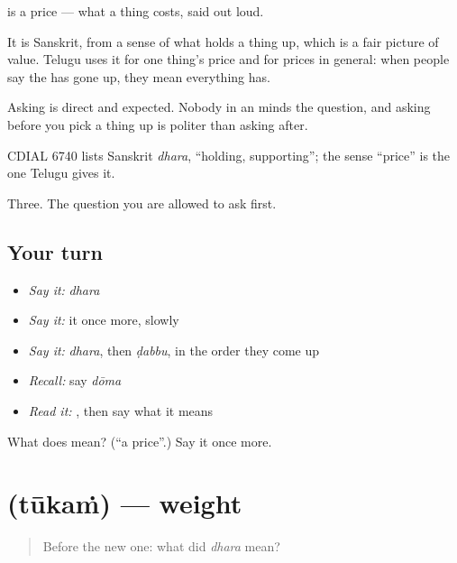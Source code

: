 is a price — what a thing costs, said out loud.

It is Sanskrit, from a sense of what holds a thing up, which is a fair picture of value. Telugu uses it for one thing's price and for prices in general: when people say the  has gone up, they mean everything has.

Asking is direct and expected. Nobody in an  minds the question, and asking before you pick a thing up is politer than asking after.

CDIAL 6740 lists Sanskrit \emph{dhara}, \textquotedblleft{}holding, supporting\textquotedblright{}; the sense \textquotedblleft{}price\textquotedblright{} is the one Telugu gives it.

\begin{grammarlens}[title={What you've built}]
Three. The question you are allowed to ask first.
\end{grammarlens}

\subsection*{Your turn}
\begin{itemize}
\raggedright
  \item \emph{Say it:} \emph{dhara}
  \item \emph{Say it:} it once more, slowly
  \item \emph{Say it:} \emph{dhara}, then \emph{ḍabbu}, in the order they come up
  \item \emph{Recall:} say \emph{dōma}
  \item \emph{Read it:} \textbf{}, then say what it means
\end{itemize}

\begin{tcolorbox}[breakable,colback=teal!4,colframe=teal!35!black,title={Before you move on}]
What does  mean? (\textquotedblleft{}a price\textquotedblright{}.) Say it once more.
\end{tcolorbox}
\section[\texorpdfstring{\te{తూకం} (tūkaṁ)}{తూకం (tūkaṁ)}]{ (tūkaṁ) — weight}

\label{lesson:TE-C72-weight}



\begin{quote}
Before the new one: what did \emph{dhara} mean?
\end{quote}

